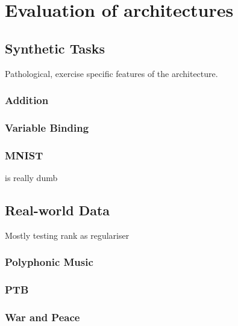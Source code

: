 
\chapter{Evaluation of architectures}\label{C:exps}
\section{Synthetic Tasks}
Pathological, exercise specific features of the architecture.
\subsection{Addition}
\subsection{Variable Binding}
\subsection{MNIST}
is really dumb

\section{Real-world Data}
Mostly testing rank as regulariser
\subsection{Polyphonic Music}
\subsection{PTB}
\subsection{War and Peace}